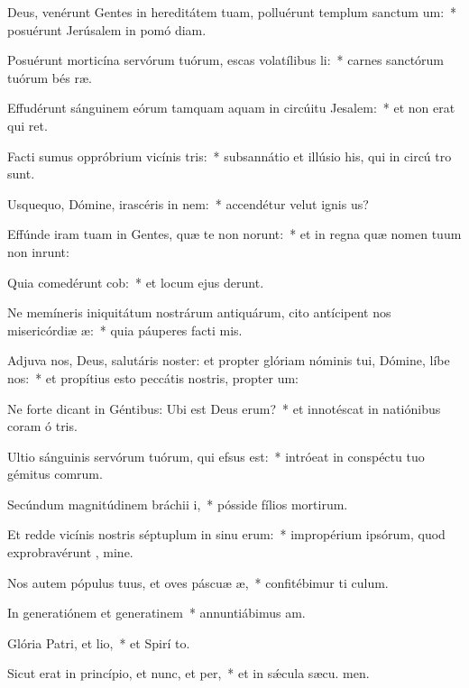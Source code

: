 \item Deus, venérunt Gentes in hereditátem tuam, polluérunt templum sanctum um:~* posuérunt Jerúsalem in pomó diam.
\item Posuérunt morticína servórum tuórum, escas volatílibus li:~* carnes sanctórum tuórum bés ræ.
\item Effudérunt sánguinem eórum tamquam aquam in circúitu Jesalem:~* et non erat qui ret.
\item Facti sumus oppróbrium vicínis tris:~* subsannátio et illúsio his, qui in circú tro sunt.
\item Usquequo, Dómine, irascéris in nem:~* accendétur velut ignis  us?
\item Effúnde iram tuam in Gentes, quæ te non norunt:~* et in regna quæ nomen tuum non inrunt:
\item Quia comedérunt cob:~* et locum ejus derunt.
\item Ne memíneris iniquitátum nostrárum antiquárum, cito antícipent nos misericórdiæ æ:~* quia páuperes facti  mis.
\item Adjuva nos, Deus, salutáris noster: et propter glóriam nóminis tui, Dómine, líbe nos:~* et propítius esto peccátis nostris, propter  um:
\item Ne forte dicant in Géntibus: Ubi est Deus erum?~* et innotéscat in natiónibus coram ó tris.
\item Ultio sánguinis servórum tuórum, qui efsus est:~* intróeat in conspéctu tuo gémitus comrum.
\item Secúndum magnitúdinem bráchii i,~* pósside fílios mortirum.
\item Et redde vicínis nostris séptuplum in sinu erum:~* impropérium ipsórum, quod exprobravérunt , mine.
\item Nos autem pópulus tuus, et oves páscuæ æ,~* confitébimur ti  culum.
\item In generatiónem et generatinem~* annuntiábimus  am.
\item Glória Patri, et lio,~* et Spirí to.
\item Sicut erat in princípio, et nunc, et per,~* et in sǽcula sæcu. men.
